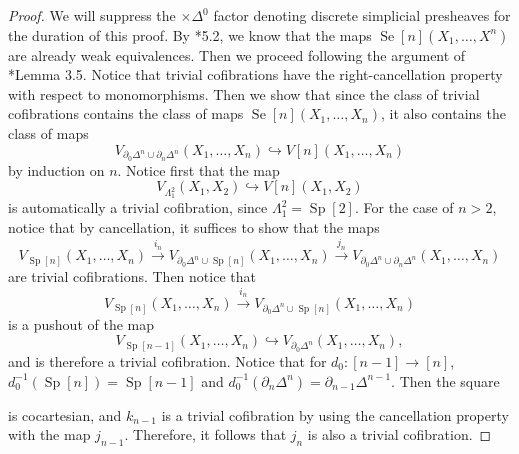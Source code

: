 \documentclass[leqno]{article}
\numberwithin{equation}{subsection}
\theoremstyle{plain}   %
\theoremstyle{remark}
\theoremstyle{plain}
\begin{document}
\begin{proof}
	We will suppress the \(\times \Delta^0\) factor denoting discrete simplicial presheaves for the duration of this proof.  By \cite{rezk-theta-n-spaces}*{5.2}, we know that the maps \(\operatorname{Se}[n](X_1,\dots,X^n)\) are already weak equivalences.  Then we proceed following the argument of \cite{jtsegal}*{Lemma 3.5}.  Notice that trivial cofibrations have the right-cancellation property with respect to monomorphisms.  Then we show that since the class of trivial cofibrations contains the class of maps \(\operatorname{Se}[n](X_1,\dots,X_n)\), it also contains the class of maps 
	\[V_{\partial_0 \Delta^n \cup \partial_n \Delta^n}(X_1,\dots,X_n)\hookrightarrow V[n](X_1,\dots,X_n)\] by induction on \(n\).  Notice first that the map
	\[V_{\Lambda^2_1}(X_1,X_2)\hookrightarrow V[n](X_1,X_2)\]
	is automatically a trivial cofibration, since \(\Lambda^2_1=\operatorname{Sp}[2]\).
	For the case of \(n>2\), notice that by cancellation, it suffices to show that the maps
	\[V_{\operatorname{Sp}[n]}(X_1,\dots, X_n) \xrightarrow{i_n} V_{\partial_0\Delta^n \cup \operatorname{Sp}[n]}(X_1,\dots, X_n) \xrightarrow{j_n} V_{\partial_0 \Delta^n \cup \partial_n \Delta^n}(X_1,\dots,X_n)\]
	are trivial cofibrations.
	Then notice that 
	\[V_{\operatorname{Sp}[n]}(X_1,\dots,X_n) \xrightarrow{i_n} V_{\partial_0 \Delta^n\cup \operatorname{Sp}[n]}(X_1,\dots,X_n)\]
	is a pushout of the map 
	\[V_{\operatorname{Sp}[n-1]}(X_1,\dots,X_n) \hookrightarrow V_{\partial_0 \Delta^n}(X_1,\dots,X_n),\]
	and is therefore a trivial cofibration.  
	Notice that for \(d_0: [n-1] \to [n]\), \(d_0^{-1}(\operatorname{Sp}[n]) = \operatorname{Sp}[n-1]\) and \(d_0^{-1}(\partial_n\Delta^n) = \partial_{n-1}\Delta^{n-1}\).  Then the square
	\begin{center}
	\end{center}
	is cocartesian, and \(k_{n-1}\) is a trivial cofibration by using the cancellation property with the map \(j_{n-1}\).
	Therefore, it follows that \(j_n\) is also a trivial cofibration. 


\end{proof}
\end{document}
